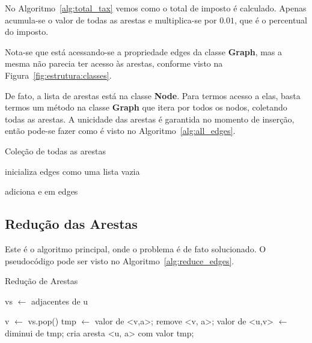 \documentclass[12pt]{article}
\begin{document}
No Algoritmo~\ref{alg:total_tax} vemos como o total de imposto é
calculado. Apenas acumula-se o valor de todas as arestas e multiplica-se por
$0.01$, que é o percentual do imposto.

Nota-se que está acessando-se a propriedade \textsf{edges} da classe
\textsf{\textbf{Graph}}, mas a mesma não parecia ter acesso às arestas, conforme
visto na Figura~\ref{fig:estrutura:classes}.

De fato, a lista de arestas está na classe \textsf{\textbf{Node}}. Para termos
acesso a elas, basta termos um método na classe \textsf{\textbf{Graph}} que
itera por todos os nodos, coletando todas as arestas. A unicidade das arestas é
garantida no momento de inserção, então pode-se fazer como é visto no Algoritmo~\ref{alg:all_edges}.

\begin{algorithm}[H]
  \caption{Coleção de todas as arestas}
  \label{alg:all_edges}
  inicializa edges como uma lista vazia

  {
    {
      adiciona e em edges
    }
  }

\end{algorithm}

\subsection{Redução das Arestas}\label{sec:algoritmo:reduce}

Este é o algoritmo principal, onde o problema é de fato solucionado. O
pseudocódigo pode ser visto no Algoritmo~\ref{alg:reduce_edges}.

\begin{algorithm}[H]
  \caption{Redução de Arestas}
  \label{alg:reduce_edges}
  {
    vs $\gets$ adjacentes de u

    {
      v $\gets$ vs.pop() 
      {
        {
          tmp $\gets$ valor de <v,a>;
          remove <v, a>;
          valor de <u,v> $\gets$ diminui de tmp;
          cria aresta <u, a> com valor tmp;
        }
      }
    }
  }
\end{algorithm}
\end{document}
